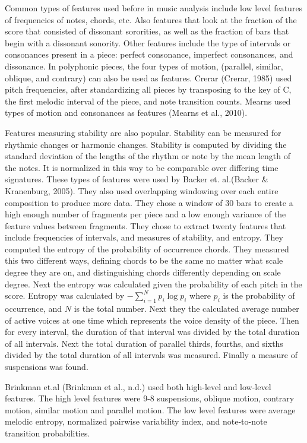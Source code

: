 \documentclass[12pt,twoside]{reedthesis}
\theoremstyle{definition}
\theoremstyle{definition}
\theoremstyle{definition}
\theoremstyle{remark}
\begin{document}
Common types of features used before in music analysis include low level
features of frequencies of notes, chords, etc. Also features that look
at the fraction of the score that consisted of dissonant sororities, as
well as the fraction of bars that begin with a dissonant sonority. Other
features include the type of intervals or consonances present in a
piece: perfect consonance, imperfect consonances, and dissonance. In
polyphonic pieces, the four types of motion, (parallel, similar,
oblique, and contrary) can also be used as features. Crerar (Crerar,
1985) used pitch frequencies, after standardizing all pieces by
transposing to the key of C, the first melodic interval of the piece,
and note transition counts. Mearns used types of motion and consonances
as features (Mearns et al., 2010).

Features measuring stability are also popular. Stability can be measured
for rhythmic changes or harmonic changes. Stability is computed by
dividing the standard deviation of the lengths of the rhythm or note by
the mean length of the notes. It is normalized in this way to be
comparable over differing time signatures. These types of features were
used by Backer et. al.(Backer \& Kranenburg, 2005). They also used
overlapping windowing over each entire composition to produce more data.
They chose a window of 30 bars to create a high enough number of
fragments per piece and a low enough variance of the feature values
between fragments. They chose to extract twenty features that include
frequencies of intervals, and measures of stability, and entropy. They
computed the entropy of the probability of occurrence chords. They
measured this two different ways, defining chords to be the same no
matter what scale degree they are on, and distinguishing chords
differently depending on scale degree. Next the entropy was calculated
given the probability of each pitch in the score. Entropy was calculated
by \(-\sum_{i = 1}^{N}p_i\log{p_i}\) where \(p_i\) is the probability of
occurrence, and \(N\) is the total number. Next they the calculated
average number of active voices at one time which represents the voice
density of the piece. Then for every interval, the duration of that
interval was divided by the total duration of all intervals. Next the
total duration of parallel thirds, fourths, and sixths divided by the
total duration of all intervals was measured. Finally a measure of
suspensions was found.

Brinkman et.al (Brinkman et al., n.d.) used both high-level and
low-level features. The high level features were 9-8 suspensions,
oblique motion, contrary motion, similar motion and parallel motion. The
low level features were average melodic entropy, normalized pairwise
variability index, and note-to-note transition probabilities.
\end{document}
